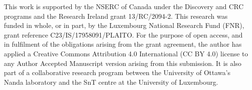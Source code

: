 This work is supported by the NSERC of Canada under the Discovery and CRC programs and the Research Ireland grant 13/RC/2094-2. This research was funded in whole, or in part, by the Luxembourg National Research Fund (FNR), grant reference C23\allowbreak/IS\allowbreak/17958091\allowbreak/PLAITO. For the purpose of open access, and in fulfilment of the obligations arising from the grant agreement, the author has applied a Creative Commons Attribution 4.0 International (CC BY 4.0) license to any Author Accepted Manuscript version arising from this submission. It is also part of a collaborative research program between the University of Ottawa’s Nanda laboratory and the SnT centre at the University of Luxembourg. 

